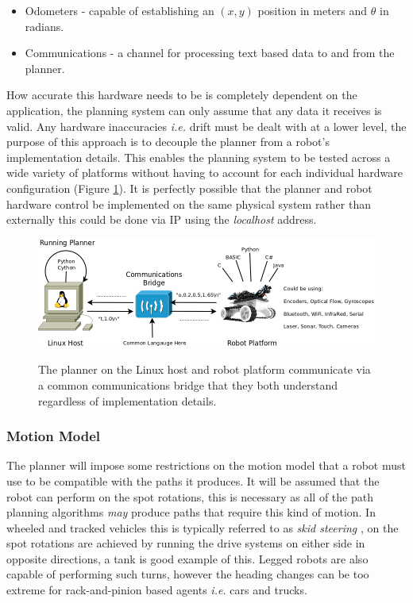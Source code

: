 \begin{itemize}
\item Odometers - capable of establishing an $(x, y)$ position in meters and $\theta$ in radians.
\item Communications - a channel for processing text based data to and from the planner.
\end{itemize}

\noindent
How accurate this hardware needs to be is completely dependent on the application, the planning system can only assume that any data it receives is valid. Any hardware inaccuracies \textit{i.e.} drift must be dealt with at a lower level, the purpose of this approach is to decouple the planner from a robot's implementation details. This enables the planning system to be tested across a wide variety of platforms without having to account for each individual hardware configuration (Figure \ref{Figure: Hardware Agent Specification.}). It is perfectly possible that the planner and robot hardware control be implemented on the same physical system rather than externally this could be done via IP using the \textit{localhost} address.

\begin{figure}[htbp]

\center \includegraphics[width=400pt]{illustrations/hardware_agent_specification}\\
\caption{The planner on the Linux host and robot platform communicate via a common communications bridge that they both understand regardless of implementation details.} 
\label{Figure: Hardware Agent Specification.}

\end{figure}

\subsubsection{Motion Model}
\noindent
The planner will impose some restrictions on the motion model that a robot must use to be compatible with the paths it produces. It will be assumed that the robot can perform on the spot rotations, this is necessary as all of the path planning algorithms \textit{may} produce paths that require this kind of motion. In wheeled and tracked vehicles this is typically referred to as \textit{skid steering} \cite{JMD14}, on the spot rotations are achieved by running the drive systems on either side in opposite directions, a tank is good example of this. Legged robots are also capable of performing such turns, however the heading changes can be too extreme for rack-and-pinion based agents \textit{i.e.} cars and trucks. 


